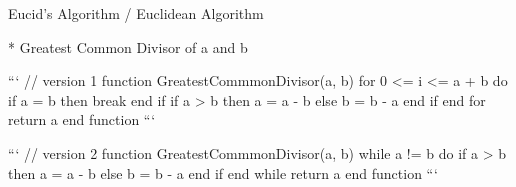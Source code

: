 Eucid's Algorithm / Euclidean Algorithm

* Greatest Common Divisor of a and b

```
// version 1
function GreatestCommmonDivisor(a, b)
  for 0 <= i <= a + b do
    if a = b then
      break
    end if
    if a > b then
      a = a - b
    else
      b = b - a
    end if
  end for
  return a
end function
```

```
// version 2
function GreatestCommmonDivisor(a, b)
  while a != b do
    if a > b then
      a = a - b
    else
      b = b - a
    end if
  end while
  return a
end function
```
